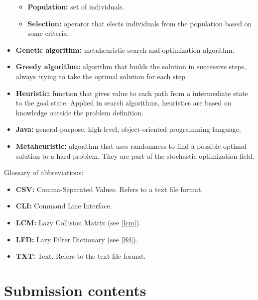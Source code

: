 \begin{itemize}
\begin{itemize}
            \item \textbf{Population:} set of individuals.
            \item \textbf{Selection:} operator that elects individuals from the population based on some criteria.
        \end{itemize}
    \item \textbf{Genetic algorithm:} metaheuristic search and optimization algorithm. 
    \item \textbf{Greedy algorithm:} algorithm that builds the solution in successive steps, always trying to take the optimal solution for each step
    \item \textbf{Heuristic:} function that gives value to each path from a intermediate state to the goal state. Applied in search algorithms, heuristics are based on knowledge outside the problem definition.
    \item \textbf{Java:} general-purpose, high-level, object-oriented programming language.
    \item \textbf{Metaheuristic:} algorithm that uses randomness to find a possible optimal solution to a hard problem. They are part of the stochastic optimization field.
\end{itemize}

Glossary of abbreviations:

\begin{itemize}
    \item \textbf{CSV:} Comma-Separated Values. Refers to a text file format.
    \item \textbf{CLI:} Command Line Interface.
    \item \textbf{LCM:} Lazy Collision Matrix (see \ref{lcm}).
    \item \textbf{LFD:} Lazy Filter Dictionary (see \ref{lfd}).
    \item \textbf{TXT:} Text. Refers to the text file format.
\end{itemize}


\section{Submission contents}

